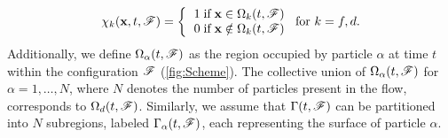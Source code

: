 \begin{align}
    \chi_k(\textbf{x},t,\FF) =  \left\{
      \begin{tabular}{cc}
        $1 \;\text{if} \;\textbf{x} \in \Omega_k(t,\FF)$\\
        $0 \;\text{if} \;\textbf{x} \notin \Omega_k(t,\FF)$
      \end{tabular}
      \right.
      \text{for $k = f,d$}.
      \label{eq:PIF}
\end{align}
Additionally, we define $\Omega_\alpha(t, \mathscr{F})$ as the region occupied by particle $\alpha$ at time $t$ within the configuration $\mathscr{F}$ (\ref{fig:Scheme}). The collective union of $\Omega_\alpha(t, \mathscr{F})$ for $\alpha = 1, \ldots, N$, where $N$ denotes the number of particles present in the flow, corresponds to $\Omega_d(t, \mathscr{F})$. Similarly, we assume that $\Gamma(t, \mathscr{F})$ can be partitioned into $N$ subregions, labeled $\Gamma_\alpha(t, \mathscr{F})$, each representing the surface of particle $\alpha$.


